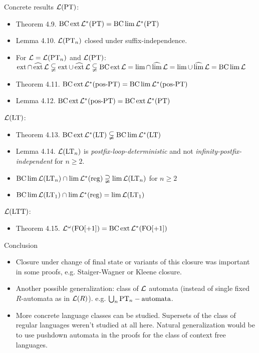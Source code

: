 \documentclass[
	handout,
	notheorems,noamsthm]{beamer}
\begin{document}
\begin{frame}[<+->]{Concrete results}
$\Lang(\PT)$:
\begin{itemize}
\item Theorem 4.9. $ \BC \ext \Lang^* (\PT) = \BC \lim \Lang^* (\PT) $
\item Lemma 4.10. $\Lang(\PT_n)$ closed under suffix-independence.
\item For $\Lang = \Lang(\PT_n)$ and $\Lang(\PT)$: $ \ext \cap \dext \Lang \subsetneqq
\ext \cup \dext \Lang \subsetneqq
\BC \ext \Lang =
\lim \cap \dlim \Lang =
\lim \cup \dlim \Lang =
\BC \lim \Lang $
\item Theorem 4.11. $\BC \ext \Lang^* (\posPT) = \BC \lim \Lang^* (\posPT)$
\item Lemma 4.12. $\BC \ext \Lang^*(\posPT) = \BC \ext \Lang^* (\PT)$
\end{itemize}
$\Lang(\LT)$:
\begin{itemize}
\item Theorem 4.13. $ \BC \ext \Lang^* (\LT) \subsetneqq \BC \lim \Lang^*(\LT) $
\item Lemma 4.14. $\Lang(\LT_n)$ is \emph{postfix-loop-deterministic} and not \emph{infinity-postfix-independent} for $n \ge 2$.
\item $\BC \lim \Lang(\LT_n) \cap \lim \Langreg \supsetneqq \lim \Lang(\LT_n)$ for $n \ge 2$
\item $\BC \lim \Lang(\LT_1) \cap \lim \Langreg = \lim \Lang(\LT_1)$
\end{itemize}
$\Lang(\LTT)$:
\begin{itemize}
\item Theorem 4.15. $ \Lang^\omega (\mathrm{FO[+1]}) = \BC \ext \Lang^*(\mathrm{FO[+1]}) $
\end{itemize}
\end{frame}

\begin{frame}[<+->]{Conclusion}
\begin{itemize}
\item Closure under change of final state or variants of this closure was important in some proofs, e.g. Staiger-Wagner or Kleene closure.
\item Another possible generalization: class of $\Lang$ automata (instead of single fixed $R$-automata as in $\Lang(R)$). e.g. $\bigcup_n \PT_n-\text{automata}$.
\item More concrete language classes can be studied. Supersets of the class of regular languages weren't studied at all here. Natural generalization would be to use pushdown automata in the proofs for the class of context free languages.
\end{itemize}
\end{frame}
\end{document}
